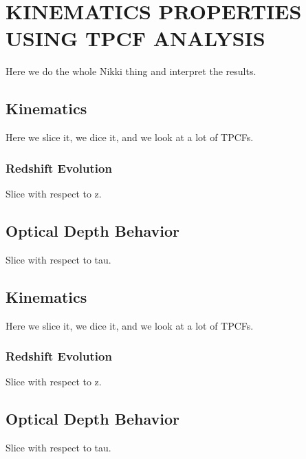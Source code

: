 \section{\MakeUppercase{Kinematics Properties using TPCF Analysis}}
\label{ch7}

Here we do the whole Nikki thing and interpret the results.

\subsection{{\MgII} Kinematics}
\label{ch7:MgII}

Here we slice it, we dice it, and we look at a lot of TPCFs.

\subsubsection{{\MgII} Redshift Evolution}
\label{ch7:MgIIredshift}

Slice with respect to z.

\subsection{{\MgII} Optical Depth Behavior}
\label{ch7:MgIIoptical}

Slice with respect to tau.

\subsection{{\CIV} Kinematics}
\label{ch7:CIV}

Here we slice it, we dice it, and we look at a lot of TPCFs.

\subsubsection{{\CIV} Redshift Evolution}
\label{ch7:CIV}

Slice with respect to z.

\subsection{{\CIV} Optical Depth Behavior}
\label{ch7:CIV}

Slice with respect to tau.
